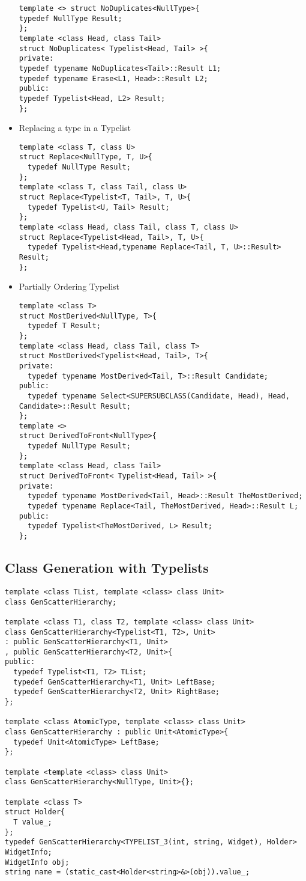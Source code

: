\begin{itemize}
\begin{verbatim}
template <> struct NoDuplicates<NullType>{
typedef NullType Result;
};
template <class Head, class Tail>
struct NoDuplicates< Typelist<Head, Tail> >{
private:
typedef typename NoDuplicates<Tail>::Result L1;
typedef typename Erase<L1, Head>::Result L2;
public:
typedef Typelist<Head, L2> Result;
};
\end{verbatim}
\item Replacing a type in a Typelist
\begin{verbatim}
template <class T, class U>
struct Replace<NullType, T, U>{
  typedef NullType Result;
};
template <class T, class Tail, class U>
struct Replace<Typelist<T, Tail>, T, U>{
  typedef Typelist<U, Tail> Result;
};
template <class Head, class Tail, class T, class U>
struct Replace<Typelist<Head, Tail>, T, U>{
  typedef Typelist<Head,typename Replace<Tail, T, U>::Result> Result;
};
\end{verbatim}
\item Partially Ordering Typelist
\begin{verbatim}
template <class T>
struct MostDerived<NullType, T>{
  typedef T Result;
};
template <class Head, class Tail, class T>
struct MostDerived<Typelist<Head, Tail>, T>{
private:
  typedef typename MostDerived<Tail, T>::Result Candidate;
public:
  typedef typename Select<SUPERSUBCLASS(Candidate, Head), Head, Candidate>::Result Result;
};
template <>
struct DerivedToFront<NullType>{
  typedef NullType Result;
};
template <class Head, class Tail>
struct DerivedToFront< Typelist<Head, Tail> >{
private:
  typedef typename MostDerived<Tail, Head>::Result TheMostDerived;
  typedef typename Replace<Tail, TheMostDerived, Head>::Result L;
public:
  typedef Typelist<TheMostDerived, L> Result;
};
\end{verbatim}
\end{itemize}

\subsection{Class Generation with Typelists}

\begin{verbatim}
template <class TList, template <class> class Unit>
class GenScatterHierarchy;

template <class T1, class T2, template <class> class Unit>
class GenScatterHierarchy<Typelist<T1, T2>, Unit>
: public GenScatterHierarchy<T1, Unit>
, public GenScatterHierarchy<T2, Unit>{
public:
  typedef Typelist<T1, T2> TList;
  typedef GenScatterHierarchy<T1, Unit> LeftBase;
  typedef GenScatterHierarchy<T2, Unit> RightBase;
};

template <class AtomicType, template <class> class Unit>
class GenScatterHierarchy : public Unit<AtomicType>{
  typedef Unit<AtomicType> LeftBase;
};

template <template <class> class Unit>
class GenScatterHierarchy<NullType, Unit>{};

template <class T>
struct Holder{
  T value_;
};
typedef GenScatterHierarchy<TYPELIST_3(int, string, Widget), Holder> WidgetInfo;
WidgetInfo obj;
string name = (static_cast<Holder<string>&>(obj)).value_;
\end{verbatim}


